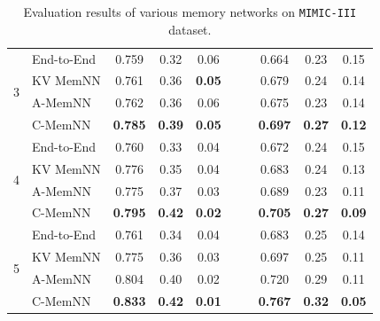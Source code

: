 \begin{table}[tbp]
\begin{tabular}{clcccccccc}
\multirow{4}{*}{3} & End-to-End & 0.759 & 0.32 & 0.06 & \multicolumn{1}{l|}{} &  & 0.664 & 0.23 & 0.15 \\
 & KV MemNN & 0.761 & 0.36 & \textbf{0.05} & \multicolumn{1}{l|}{} &  & 0.679 & 0.24 & 0.14 \\
 & A-MemNN & 0.762 & 0.36 & 0.06 & \multicolumn{1}{l|}{} &  & 0.675 & 0.23 & 0.14 \\
 & C-MemNN & \textbf{0.785} & \textbf{0.39} & \textbf{0.05} & \multicolumn{1}{l|}{} &  & \textbf{0.697} & \textbf{0.27} & \textbf{0.12} \\
  \bottomrule
\multirow{4}{*}{4} & End-to-End & 0.760 & 0.33 & 0.04 & \multicolumn{1}{l|}{} &  & 0.672 & 0.24 & 0.15 \\
 & KV MemNN & 0.776 & 0.35 & 0.04 & \multicolumn{1}{l|}{} &  & 0.683 & 0.24 & 0.13 \\
 & A-MemNN & 0.775 & 0.37 & 0.03 & \multicolumn{1}{l|}{} &  & 0.689 & 0.23 & 0.11 \\
 & C-MemNN & \textbf{0.795} & \textbf{0.42} & \textbf{0.02} & \multicolumn{1}{l|}{} &  & \textbf{0.705} & \textbf{0.27} & \textbf{0.09} \\
  \bottomrule
\multirow{4}{*}{5} & End-to-End & 0.761 & 0.34 & 0.04 & \multicolumn{1}{l|}{} &  & 0.683 & 0.25 & 0.14 \\
 & KV MemNN & 0.775 & 0.36 & 0.03 & \multicolumn{1}{l|}{} &  & 0.697 & 0.25 & 0.11 \\
 & A-MemNN & 0.804 & 0.40 & 0.02 & \multicolumn{1}{l|}{} &  & 0.720 & 0.29 & 0.11 \\
 & C-MemNN & \textbf{0.833} & \textbf{0.42} & \textbf{0.01} & \multicolumn{1}{l|}{} &  & \textbf{0.767} & \textbf{0.32} & \textbf{0.05} \\
 \bottomrule
\end{tabular}

\caption[Results]{Evaluation results of various memory networks on \texttt{MIMIC-III} dataset.}
\end{table}

